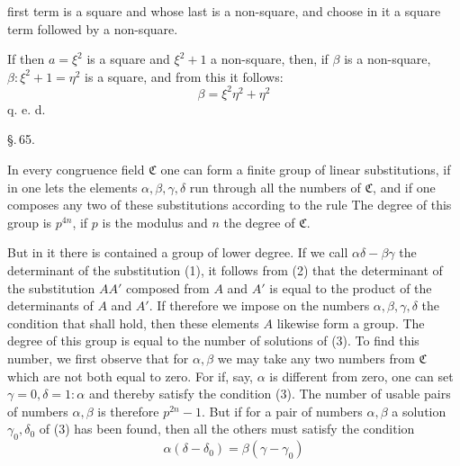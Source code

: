 first term is a square and whose last is a non-square, and choose in it a square term followed by a non-square.

If then $a = \xi^2$ is a square and $\xi^2 + 1$ a non-square, then, if $\beta$ is a non-square, $\beta : \xi^2 + 1 = \eta^2$ is a square, and from this it follows:
\[ \beta = \xi^2 \eta^2 + \eta^2 \]
q. e. d.

\begin{center}
\S.\,65.

\end{center}

In every congruence field $\mathfrak{C}$ one can form a finite group of linear substitutions, if in
one lets the elements $\alpha, \beta, \gamma, \delta$ run through all the numbers of $\mathfrak{C}$, and if one composes any two of these substitutions according to the rule
The degree of this group is $p^{4n}$, if $p$ is the modulus and $n$ the degree of $\mathfrak{C}$.

But in it there is contained a group of lower degree. If we call $\alpha\delta - \beta\gamma$ the determinant of the substitution (1), it follows from (2) that the determinant of the substitution $AA'$ composed from $A$ and $A'$ is equal to the product of the determinants of $A$ and $A'$. If therefore we impose on the numbers $\alpha, \beta, \gamma, \delta$ the condition that
shall hold, then these elements $A$ likewise form a group. The degree of this group is equal to the number of solutions of (3). To find this number, we first observe that for $\alpha, \beta$ we may take any two numbers from $\mathfrak{C}$ which are not both equal to zero. For if, say, $\alpha$ is different from zero, one can set $\gamma = 0, \delta = 1 : \alpha$ and thereby satisfy the condition (3). The number of usable pairs of numbers $\alpha, \beta$ is therefore $p^{2n} - 1$. But if for a pair of numbers $\alpha, \beta$ a solution $\gamma_0, \delta_0$ of (3) has been found, then all the others must satisfy the condition
\[ \alpha (\delta - \delta_0) = \beta (\gamma - \gamma_0) \]
